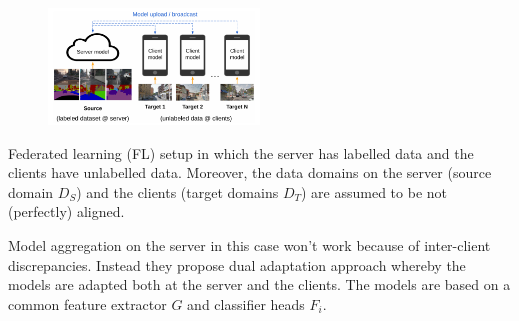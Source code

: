 \begin{figure}
\centering
\includegraphics[width=0.5\textwidth]{fmtda_Figure1.png}
\end{figure}
Federated learning (FL) setup in which the server has labelled data and the clients have unlabelled data. Moreover, the data domains on the server (source domain $D_S$) and the clients (target domains $D_T$) are assumed to be not (perfectly) aligned.

Model aggregation on the server in this case won't work because of inter-client discrepancies. Instead they propose dual adaptation approach whereby the models are adapted both at the server and the clients. The models are based on a common feature extractor $G$ and classifier heads $F_i$.

